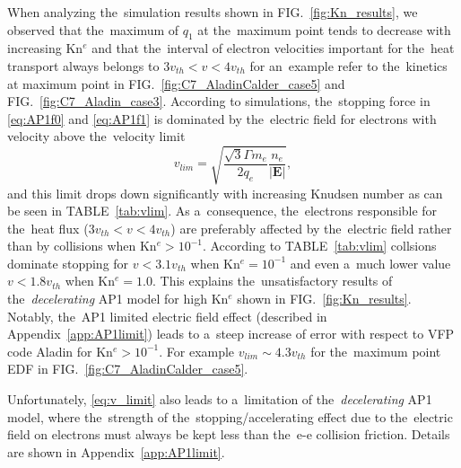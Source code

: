 \documentclass[
 aps,
 jmp,
 amsmath,amssymb,
 twocolumn,
]{revtex4-1}
\newcommand{\figref}[1]{FIG.~\ref{#1}}
\newcommand{\appref}[1]{Appendix~\ref{#1}}
\newcommand{\tabref}[1]{TABLE~\ref{#1}}
\newcommand{\vect}[1]{\boldsymbol{#1}}
\newcommand{\vmag}{v}
\newcommand{\vth}{v_{th}}
\newcommand{\E}{\vect{E}}
\newcommand{\qe}{q_e}
\newcommand{\me}{m_e}
\begin{document}
When analyzing the~simulation results shown in \figref{fig:Kn_results}, 
we observed that 
the~maximum of $q_1$ at the~maximum point tends to decrease with increasing 
Kn$^e$ and that the~interval of electron velocities important for 
the~heat transport always belongs to $3 \vth < \vmag <4 \vth$ for an~example
refer to the~kinetics at maximum point in \figref{fig:C7_AladinCalder_case5} 
and \figref{fig:C7_Aladin_case3}. 
According to simulations,
the~stopping force in \eqref{eq:AP1f0} and \eqref{eq:AP1f1} is dominated by
the~electric field for electrons with velocity above the~velocity limit
\begin{equation}
  \vmag_{lim} = \sqrt{\frac{\sqrt{3}\Gamma\me}{2\qe}\frac{n_e}{|\E|}}
  ,
  \label{eq:v_limit}
\end{equation}
and this limit drops 
down significantly with increasing Knudsen number as can be seen 
in \tabref{tab:vlim}. 
As a~consequence, the~electrons responsible for the~heat flux
($3 \vth < \vmag <4 \vth$) are preferably affected by the~electric field
rather than by collisions when Kn$^{e} > 10^{-1}$. According to 
\tabref{tab:vlim} collsions dominate stopping for $\vmag < 3.1 \vth$ 
when Kn$^e = 10^{-1}$ and even a~much lower value $\vmag < 1.8 \vth$ 
when Kn$^e = 1.0$. This explains the~unsatisfactory results of 
the~\textit{decelerating} AP1
model for high Kn$^e$ shown in \figref{fig:Kn_results}. 
Notably, the~AP1 limited electric field effect (described in 
\appref{app:AP1limit}) leads to a~steep increase of error with respect 
to VFP code Aladin for Kn$^e > 10^{-1}$. 
For example $\vmag_{lim}\sim 4.3\vth$ for the~maximum point EDF in 
\figref{fig:C7_AladinCalder_case5}.

Unfortunately, \eqref{eq:v_limit} also leads to a~limitation of 
the~\textit{decelerating} AP1 model, where the~strength of the~stopping/accelerating effect due to the~electric field on electrons must always 
be kept less than the~e-e collision friction. Details are shown 
in \appref{app:AP1limit}.
\end{document}
